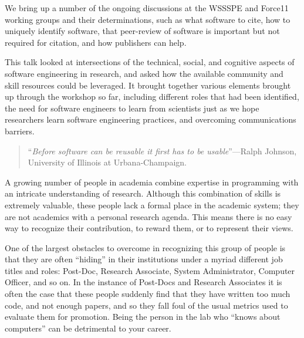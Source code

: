 \documentclass[a4paper,UKenglish]{dagrep}
\begin{document}
We bring up a number of the ongoing discussions at the WSSSPE and Force11 working groups and their determinations, such as what software to cite, how to uniquely identify software, that peer-review of software is important but not required for citation, and how publishers can help.


 This talk looked at intersections of the technical, social, and cognitive aspects of software engineering in research, and asked how the available community and skill resources could be leveraged. It brought together various elements brought up through the workshop so far, including different roles that had been identified, the need for software engineers to learn from scientists just as we hope researchers learn software engineering practices, and overcoming communications barriers.



\begin{quote}
``\textit{Before software can be reusable it first has to be usable}''---Ralph Johnson, University of Illinois at Urbana-Champaign.
\end{quote}

A growing number of people in academia combine expertise in programming with an intricate understanding of research. Although this combination of skills is extremely valuable, these people lack a formal place in the academic system; they are not academics with a personal research agenda. This means there is no easy way to recognize their contribution, to reward them, or to represent their views.

One of the largest obstacles to overcome in recognizing this group of people is that they are often ``hiding'' in their institutions under a myriad different job titles and roles: Post-Doc, Research Associate, System Administrator, Computer Officer, and so on. In the instance of Post-Docs and Research Associates it is often the case that these people suddenly find that they have written too much code, and not enough papers, and so they fall foul of the usual metrics used to evaluate them for promotion. Being the person in the lab who ``knows about computers'' can be detrimental to your career.
\end{document}
